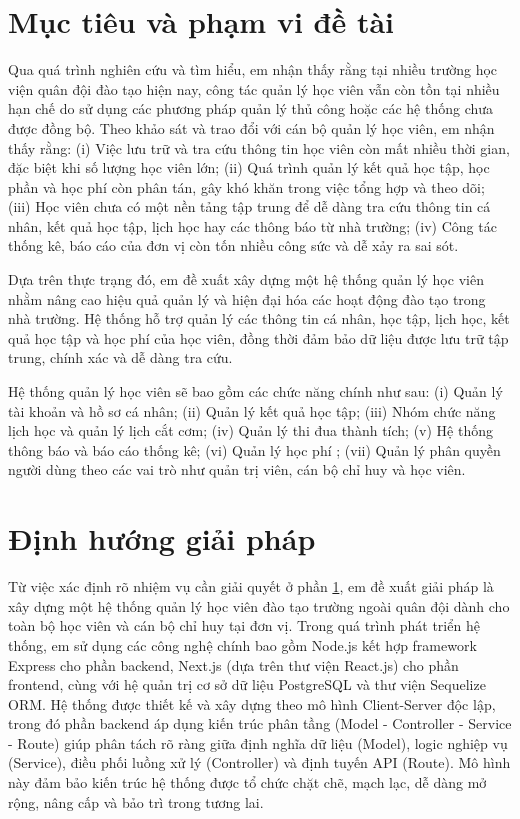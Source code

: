 \documentclass[../DoAn.tex]{subfiles}
\begin{document}
\section{Mục tiêu và phạm vi đề tài}
\label{section:1.2}
Qua quá trình nghiên cứu và tìm hiểu, em nhận thấy rằng tại nhiều trường học viện quân đội đào tạo hiện nay, công tác quản lý học viên vẫn còn tồn tại nhiều hạn chế do sử dụng các phương pháp quản lý thủ công hoặc các hệ thống chưa được đồng bộ. Theo khảo sát và trao đổi với cán bộ quản lý học viên, em nhận thấy rằng: (i) Việc lưu trữ và tra cứu thông tin học viên còn mất nhiều thời gian, đặc biệt khi số lượng học viên lớn; (ii) Quá trình quản lý
kết quả học tập, học phần và học phí còn phân tán, gây khó khăn trong việc tổng hợp và theo dõi; (iii) Học viên chưa có một nền tảng tập trung để dễ dàng tra cứu thông tin cá nhân, kết quả học tập, lịch học hay các thông báo từ nhà trường; (iv) Công tác thống kê, báo cáo của đơn vị còn tốn nhiều công sức và dễ xảy ra sai sót.

Dựa trên thực trạng đó, em đề xuất xây dựng một hệ thống quản lý học viên nhằm nâng cao hiệu quả quản lý và hiện đại hóa các hoạt động đào tạo trong nhà trường. Hệ thống hỗ trợ quản lý các thông tin cá nhân, học tập, lịch học, kết quả học tập và học phí của học viên, đồng thời đảm bảo dữ liệu được lưu trữ tập trung, chính xác và dễ dàng tra cứu.

Hệ thống quản lý học viên sẽ bao gồm các chức năng chính như sau: (i) Quản lý tài khoản và hồ sơ cá nhân; (ii) Quản lý kết quả học tập; (iii) Nhóm chức năng lịch học và quản lý lịch cắt cơm; (iv) Quản lý thi đua thành tích; (v) Hệ thống thông báo và báo cáo thống kê; (vi) Quản lý học phí ; (vii) Quản lý phân quyền người dùng theo các vai trò như quản trị viên, cán bộ chỉ huy và học viên.


\section{Định hướng giải pháp}
\label{section:1.3}
Từ việc xác định rõ nhiệm vụ cần giải quyết ở phần \ref{section:1.2}, em đề xuất giải pháp là xây dựng một hệ thống quản lý học viên đào tạo trường ngoài quân đội dành cho toàn bộ học viên và cán bộ chỉ huy tại đơn vị. Trong quá trình phát triển hệ thống, em sử dụng các công nghệ chính bao gồm Node.js kết hợp framework Express cho phần backend, Next.js (dựa trên thư viện React.js) cho phần frontend, cùng với hệ quản trị cơ sở dữ liệu PostgreSQL và thư viện Sequelize ORM. Hệ thống được thiết kế và xây dựng theo mô hình Client-Server độc lập, trong đó phần backend áp dụng kiến trúc phân tầng (Model - Controller - Service - Route) giúp phân tách rõ ràng giữa định nghĩa dữ liệu (Model), logic nghiệp vụ (Service), điều phối luồng xử lý (Controller) và định tuyến API (Route). Mô hình này đảm bảo kiến trúc hệ thống được tổ chức chặt chẽ, mạch lạc, dễ dàng mở rộng, nâng cấp và bảo trì trong tương lai.
\end{document}
